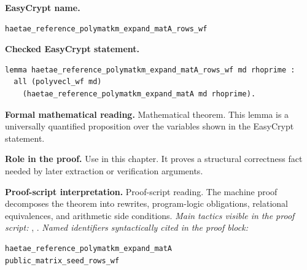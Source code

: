 \begin{formaltheorem}
\noindent\textbf{EasyCrypt name.}
\begin{lstlisting}[language=EasyCrypt,basicstyle=\ttfamily\scriptsize]
haetae_reference_polymatkm_expand_matA_rows_wf
\end{lstlisting}
\noindent\textbf{Checked EasyCrypt statement.}
\begin{lstlisting}[language=EasyCrypt,basicstyle=\ttfamily\scriptsize]
lemma haetae_reference_polymatkm_expand_matA_rows_wf md rhoprime :
  all (polyvecl_wf md)
    (haetae_reference_polymatkm_expand_matA md rhoprime).
\end{lstlisting}
\noindent\textbf{Formal mathematical reading.}
Mathematical theorem. This lemma is a universally quantified proposition over the variables shown in the EasyCrypt statement.

\noindent\textbf{Role in the proof.}
Use in this chapter. It proves a structural correctness fact needed by later extraction or verification arguments.

\noindent\textbf{Proof-script interpretation.}
Proof-script reading. The machine proof decomposes the theorem into rewrites, program-logic obligations, relational equivalences, and arithmetic side conditions.
\emph{Main tactics visible in the proof script:} , .
\emph{Named identifiers syntactically cited in the proof block:}
\begin{lstlisting}[language=EasyCrypt,basicstyle=\ttfamily\scriptsize]
haetae_reference_polymatkm_expand_matA
public_matrix_seed_rows_wf
\end{lstlisting}

\end{formaltheorem}

